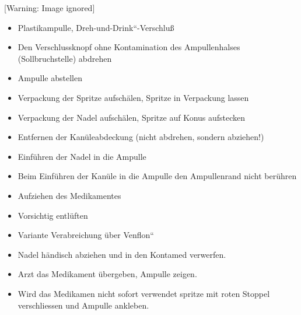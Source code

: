 \documentclass{article}
\begin{document}
\begin{center}
 [Warning: Image ignored] %

\end{center}
\begin{itemize}
\item Plastikampulle,
{\quotedblbase}Dreh-und-Drink{\textquotedblleft}-Verschlu{\ss}

\end{itemize}
\begin{itemize}
\item Den Verschlussknopf ohne Kontamination des Ampullenhalses
(Sollbruchstelle) abdrehen

\end{itemize}
\begin{itemize}
\item Ampulle abstellen

\end{itemize}
\begin{itemize}
\item Verpackung der Spritze aufsch\"alen, Spritze in Verpackung lassen

\item Verpackung der Nadel aufsch\"alen, Spritze auf Konus aufstecken

\item Entfernen der Kan\"uleabdeckung (nicht abdrehen, sondern
abziehen!)

\item Einf\"uhren der Nadel in die Ampulle

\end{itemize}
\begin{itemize}
\item Beim Einf\"uhren der Kan\"ule in die Ampulle den Ampullenrand
nicht ber\"uhren

\end{itemize}
\begin{itemize}
\item Aufziehen des Medikamentes

\item Vorsichtig entl\"uften

\item Variante {\quotedblbase}Verabreichung \"uber
Venflon{\textquotedblleft} 

\end{itemize}
\begin{itemize}
\item Nadel h\"andisch abziehen und in den Kontamed verwerfen. 

\item Arzt das Medikament \"ubergeben, Ampulle zeigen.

\item Wird das Medikamen nicht sofort verwendet spritze mit roten
Stoppel verschliessen und Ampulle ankleben.

\end{itemize}
\end{document}
